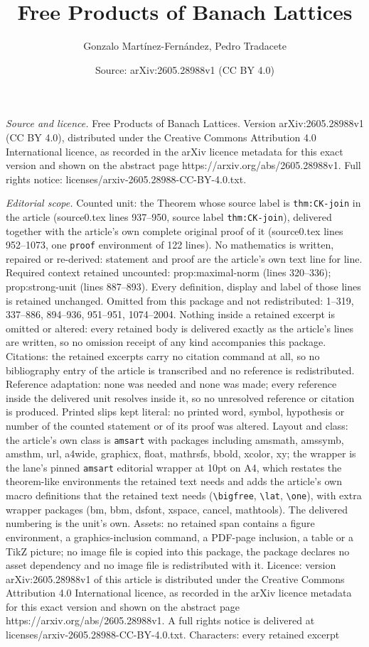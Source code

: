\documentclass[10pt,a4paper]{amsart}
\title[Free Products of Banach Lattices]{Free Products of Banach Lattices}
\author{Gonzalo Mart\'inez-Fern\'andez, Pedro Tradacete}
\date{Source: arXiv:2605.28988v1 (CC BY 4.0)}
\begin{document}
\maketitle

\noindent\emph{Source and licence.} Free Products of Banach Lattices. Version arXiv:2605.28988v1 (CC BY 4.0), distributed under the Creative Commons Attribution 4.0 International licence, as recorded in the arXiv licence metadata for this exact version and shown on the abstract page https://arxiv.org/abs/2605.28988v1. Full rights notice: licenses/arxiv-2605.28988-CC-BY-4.0.txt.\par\smallskip

\noindent\textit{Editorial scope.} Counted unit: the Theorem whose source label is \texttt{thm:CK-join} in the article (source0.tex lines 937--950, source label \texttt{thm:CK-join}), delivered together with the article's own complete original proof of it (source0.tex lines 952--1073, one \texttt{proof} environment of 122 lines). No mathematics is written, repaired or re-derived: statement and proof are the article's own text line for line. Required context retained uncounted: prop:maximal-norm (lines 320--336); prop:strong-unit (lines 887--893). Every definition, display and label of those lines is retained unchanged. Omitted from this package and not redistributed: 1--319, 337--886, 894--936, 951--951, 1074--2004. Nothing inside a retained excerpt is omitted or altered: every retained body is delivered exactly as the article's lines are written, so no omission receipt of any kind accompanies this package. Citations: the retained excerpts carry no citation command at all, so no bibliography entry of the article is transcribed and no reference is redistributed. Reference adaptation: none was needed and none was made; every reference inside the delivered unit resolves inside it, so no unresolved reference or citation is produced. Printed slips kept literal: no printed word, symbol, hypothesis or number of the counted statement or of its proof was altered. Layout and class: the article's own class is \texttt{amsart} with packages including amsmath, amssymb, amsthm, url, a4wide, graphicx, float, mathrsfs, bbold, xcolor, xy; the wrapper is the lane's pinned \texttt{amsart} editorial wrapper at 10pt on A4, which restates the theorem-like environments the retained text needs and adds the article's own macro definitions that the retained text needs (\texttt{\textbackslash bigfree}, \texttt{\textbackslash lat}, \texttt{\textbackslash one}), with extra wrapper packages (bm, bbm, dsfont, xspace, cancel, mathtools). The delivered numbering is the unit's own. Assets: no retained span contains a figure environment, a graphics-inclusion command, a PDF-page inclusion, a table or a TikZ picture; no image file is copied into this package, the package declares no asset dependency and no image file is redistributed with it. Licence: version arXiv:2605.28988v1 of this article is distributed under the Creative Commons Attribution 4.0 International licence, as recorded in the arXiv licence metadata for this exact version and shown on the abstract page https://arxiv.org/abs/2605.28988v1. A full rights notice is delivered at licenses/arxiv-2605.28988-CC-BY-4.0.txt. Characters: every retained excerpt 
\end{document}
